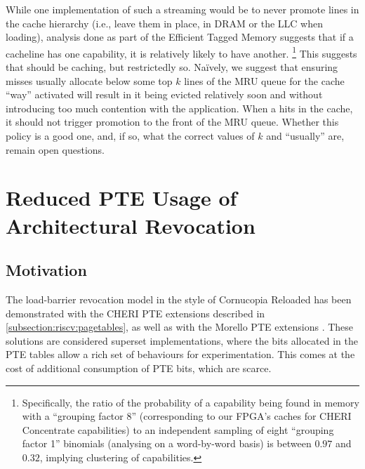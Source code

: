 While one implementation of such a streaming  would be to never promote
lines in the cache hierarchy (i.e., leave them in place, in DRAM or the LLC
when loading), analysis done as part of the Efficient Tagged Memory \cite[\S
VI.B]{joannou2017:tagged-memory} suggests that if a cacheline has one
capability, it is relatively likely to have another.%
%
\footnote{Specifically, the ratio of the probability of a capability being
found in memory with a ``grouping factor 8'' (corresponding to our FPGA's
caches for CHERI Concentrate capabilities) to an independent sampling of
eight ``grouping factor 1'' binomials (analysing on a word-by-word basis) is
between $0.97$ and $0.32$, implying clustering of capabilities.}
%
This suggests that  should be caching, but restrictedly
so.  Na\"ively, we suggest that ensuring misses usually allocate below some
top $k$ lines of the MRU queue for the cache ``way'' activated will result
in it being evicted relatively soon and without introducing too much
contention with the application.  When a  hits in the
cache, it should not trigger promotion to the front of the MRU queue.
Whether this policy is a good one, and, if so, what the correct values of
$k$ and ``usually'' are, remain open questions.



\section{Reduced PTE Usage of Architectural Revocation} %
\label{app:exp:dirtycrg}

\subsection{Motivation} %
The load-barrier revocation model in the style of Cornucopia Reloaded
\cite{cornucopia-reloaded} has been demonstrated with the CHERI PTE extensions
described in \cref{subsection:riscv:pagetables}, as well as with the Morello
PTE extensions \cite{arm-morello}.
These solutions are considered superset implementations, where the bits
allocated in the PTE tables allow a rich set of behaviours for experimentation.
This comes at the cost of additional consumption of PTE bits, which are scarce.

